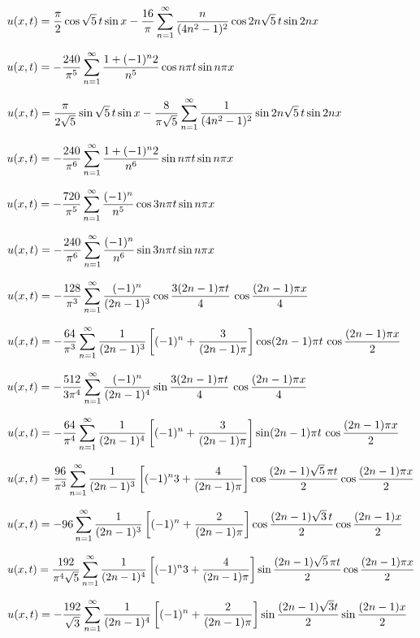 $u(x,t)=\displaystyle\frac{\pi}{2}\cos\sqrt{5}\,t\sin x-\frac{16}{\pi}
\sum_{n=1}^\infty\frac{n}{(4n^2-1)^2}\cos2n\sqrt5\,t\sin 2nx$

$u(x,t)=\displaystyle-\frac{240}{\pi^5}\sum_{n=1}^\infty\frac{1+(-1)^n2}{n^5}
\cos n\pi t\sin n\pi x$


$u(x,t)=\displaystyle\frac{\pi}{2\sqrt5}\sin\sqrt{5}\,t\sin x-\frac{8}{\pi\sqrt5}
\sum_{n=1}^\infty\frac{1}{(4n^2-1)^2}\sin2n\sqrt5\,t\sin 2nx$



$u(x,t)=\displaystyle-\frac{240}{\pi^6}\sum_{n=1}^\infty\frac{1+(-1)^n2}{n^6}
\sin n\pi t\sin n\pi x$


$u(x,t)=\displaystyle-\frac{720}{\pi^5}\sum_{n=1}^\infty\frac{(-1)^n}{n^5}
\cos3n\pi t\sin n\pi x$


$u(x,t)=\displaystyle-\frac{240}{\pi^6}\sum_{n=1}^\infty\frac{(-1)^n}{n^6}
\sin3n\pi t\sin n\pi x$








$u(x,t)=-\displaystyle
\frac{128}{\pi^3}\sum_{n=1}^\infty\frac{(-1)^n}{(2n-1)^3}\cos\frac{3(2n-1)\pi t}{4}\,\cos\frac{(2n-1)\pi x}{4}$


$u(x,t)=-\displaystyle\frac{64}{\pi^3}\sum_{n=1}^\infty\frac{1}{(2n-1)^3}\left[
(-1)^n+\frac{3}{(2n-1)\pi}\right]\cos(2n-1)\pi t\,\cos\frac{(2n-1)\pi
x}{2}$

$u(x,t)=-\displaystyle
\frac{512}{3\pi^4}\sum_{n=1}^\infty\frac{(-1)^n}{(2n-1)^4}\sin\frac{3(2n-1)\pi t}{4}\,\cos\frac{(2n-1)\pi x}{4}$

$u(x,t)=-\displaystyle\frac{64}{\pi^4}\sum_{n=1}^\infty\frac{1}{(2n-1)^4}\left[
(-1)^n+\frac{3}{(2n-1)\pi}\right]\sin(2n-1)\pi t\,\cos\frac{(2n-1)\pi
x}{2}$

$u(x,t)=\displaystyle\frac{96}{\pi^3}\sum_{n=1}^\infty\frac{1}{(2n-1)^3}\left[
(-1)^n3+\frac{4}{(2n-1)\pi}\right]\cos\frac{(2n-1)\sqrt5\,\pi
t}{2}\cos\frac{(2n-1)\pi x}{2}$


$u(x,t)=-\displaystyle96\sum_{n=1}^\infty\frac{1}{(2n-1)^3}\left[
(-1)^n+\frac{2}{(2n-1)\pi}\right]\cos\frac{(2n-1)\sqrt3\, t}{2}\cos\frac{(2n-1)
x}{2}$


$u(x,t)=\displaystyle\frac{192}{\pi^4\sqrt5}\sum_{n=1}^\infty\frac{1}{(2n-1)^4}\left[
(-1)^n3+\frac{4}{(2n-1)\pi}\right]\sin\frac{(2n-1)\sqrt5\,\pi
t}{2}\cos\frac{(2n-1)\pi x}{2}$

$u(x,t)=-\displaystyle\frac{192}{\sqrt3}\sum_{n=1}^\infty\frac{1}{(2n-1)^4}\left[
(-1)^n+\frac{2}{(2n-1)\pi}\right]\sin\frac{(2n-1)\sqrt3 t}{2}\sin\frac{(2n-1)
x}{2}$


